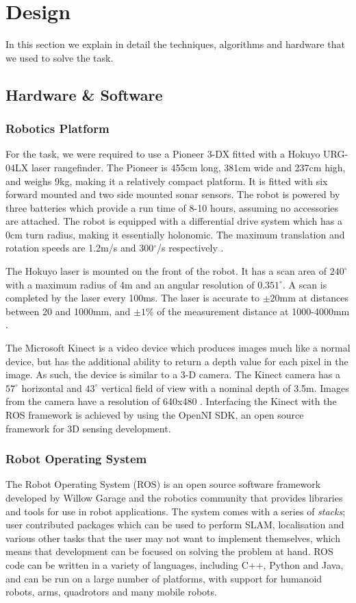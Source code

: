 \documentclass[conference]{IEEEtran}
\begin{document}
\section{Design}
In this section we explain in detail the techniques, algorithms and hardware that we used to solve the task.
\subsection{Hardware \& Software}
\subsubsection{Robotics Platform}

For the task, we were required to use a Pioneer 3-DX fitted with a Hokuyo URG-04LX laser rangefinder. The Pioneer is 455cm long, 381cm wide and 237cm high, and weighs 9kg, making it a relatively compact platform. It is fitted with six forward mounted and two side mounted sonar sensors. The robot is powered by three batteries which provide a run time of 8-10 hours, assuming no accessories are attached. The robot is equipped with a differential drive system which has a 0cm turn radius, making it essentially holonomic. The maximum translation and rotation speeds are 1.2m/s and 300$^\circ$/s respectively \cite{pioneer}. 

The Hokuyo laser is mounted on the front of the robot. It has a scan area of $240^\circ$ with a maximum radius of 4m and an angular resolution of $0.351^\circ$. A scan is completed by the laser every 100ms. The laser is accurate to $\pm 20$mm at distances between 20 and 1000mm, and $\pm 1$\% of the measurement distance at 1000-4000mm \cite{hokuyo}.

The Microsoft Kinect is a video device which produces images much like a normal device, but has the additional ability to return a depth value for each pixel in the image. As such, the device is similar to a 3-D camera. The Kinect camera has a $57^\circ$ horizontal and $43^\circ$ vertical field of view with a nominal depth of 3.5m. Images from the camera have a resolution of 640x480 \cite{Kinect}. Interfacing the Kinect with the ROS framework is achieved by using the OpenNI SDK, an open source framework for 3D sensing development.
\subsubsection{Robot Operating System}
The Robot Operating System (ROS) is an open source software framework developed by Willow Garage and the robotics community that provides libraries and tools for use in robot applications. The system comes with a series of \emph{stacks}; user contributed packages which can be used to perform SLAM, localisation and various other tasks that the user may not want to implement themselves, which means that development can be focused on solving the problem at hand. ROS code can be written in a variety of languages, including C++, Python and Java, and can be run on a large number of platforms, with support for humanoid robots, arms, quadrotors and many mobile robots.
\end{document}
